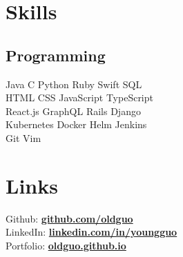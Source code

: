 \documentclass[]{deedy-resume}
\begin{document}
\begin{minipage}[t]{0.33\textwidth}
\sectionsep{}


\section{Skills}
\subsection{Programming}
Java \textbullet{} C \textbullet{} Python \textbullet{} Ruby \textbullet{}Swift \textbullet{} SQL\\
HTML \textbullet{} CSS \textbullet{} JavaScript \textbullet{} TypeScript \\
React.js \textbullet{} GraphQL \textbullet{} Rails \textbullet{} Django \\
Kubernetes \textbullet{} Docker \textbullet{} Helm \textbullet{} Jenkins\\
Git \textbullet{} Vim
\sectionsep{}


\section{Links}
Github: \href{https://github.com/oldguo}{\textbf{github.com/oldguo}} \\
LinkedIn: \href{https://linkedin.com/in/youngguo}{\textbf{linkedin.com/in/youngguo}} \\
Portfolio: \href{https://oldguo.github.io/}{\textbf{oldguo.github.io}}
\sectionsep{}


%
%

\end{minipage}
\hfill
\end{document}
